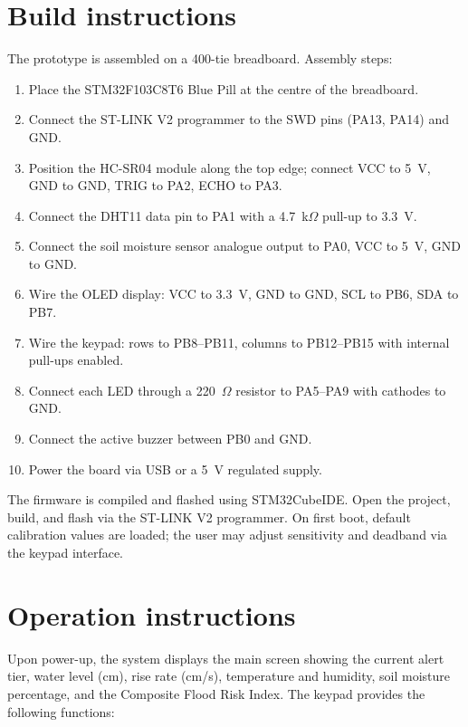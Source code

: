 \documentclass[5p,twocolumn]{elsarticle}
\begin{document}
\section{Build instructions}

The prototype is assembled on a 400-tie breadboard. Assembly steps:

\begin{enumerate}[nosep]
  \item Place the STM32F103C8T6 Blue Pill at the centre of the breadboard.
  \item Connect the ST-LINK V2 programmer to the SWD pins (PA13, PA14) and GND.
  \item Position the HC-SR04 module along the top edge; connect VCC to 5~V, GND to GND, TRIG to PA2, ECHO to PA3.
  \item Connect the DHT11 data pin to PA1 with a 4.7~k$\Omega$ pull-up to 3.3~V.
  \item Connect the soil moisture sensor analogue output to PA0, VCC to 5~V, GND to GND.
  \item Wire the OLED display: VCC to 3.3~V, GND to GND, SCL to PB6, SDA to PB7.
  \item Wire the keypad: rows to PB8--PB11, columns to PB12--PB15 with internal pull-ups enabled.
  \item Connect each LED through a 220~$\Omega$ resistor to PA5--PA9 with cathodes to GND.
  \item Connect the active buzzer between PB0 and GND.
  \item Power the board via USB or a 5~V regulated supply.
\end{enumerate}

The firmware is compiled and flashed using STM32CubeIDE. Open the project, build, and flash via the ST-LINK V2 programmer. On first boot, default calibration values are loaded; the user may adjust sensitivity and deadband via the keypad interface.


\section{Operation instructions}

Upon power-up, the system displays the main screen showing the current alert tier, water level (cm), rise rate (cm/s), temperature and humidity, soil moisture percentage, and the Composite Flood Risk Index. The keypad provides the following functions:
\end{document}

